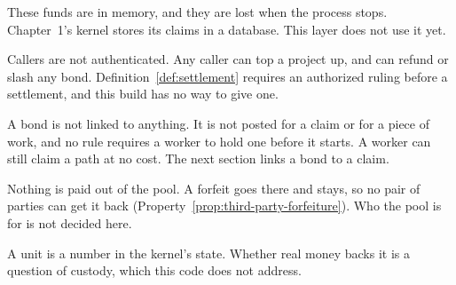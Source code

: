 \begin{pdboundary}
\setlength{\parskip}{4pt plus 1pt}
These funds are in memory, and they are lost when the process stops.
Chapter~1's kernel stores its claims in a database. This layer does not
use it yet.

Callers are not authenticated. Any caller can top a project up, and can
refund or slash any bond. Definition~\ref{def:settlement} requires an
authorized ruling before a settlement, and this build has no way to give
one.

A bond is not linked to anything. It is not posted for a claim or for a
piece of work, and no rule requires a worker to hold one before it starts.
A worker can still claim a path at no cost. The next section links a bond
to a claim.

Nothing is paid out of the pool. A forfeit goes there and stays, so no
pair of parties can get it back
(Property~\ref{prop:third-party-forfeiture}). Who the pool is for is not
decided here.

A unit is a number in the kernel's state. Whether real money backs it is
a question of custody, which this code does not address.
\end{pdboundary}
